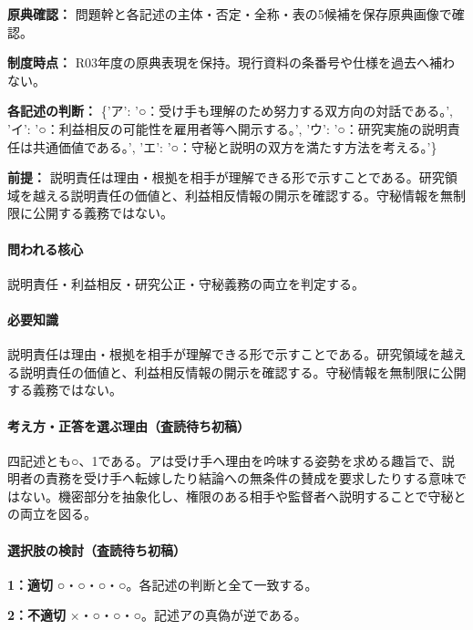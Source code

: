 \noindent\textbf{原典確認：} 問題幹と各記述の主体・否定・全称・表の5候補を保存原典画像で確認。\par

\noindent\textbf{制度時点：} R03年度の原典表現を保持。現行資料の条番号や仕様を過去へ補わない。\par

\noindent\textbf{各記述の判断：} \{'ア': '○：受け手も理解のため努力する双方向の対話である。', 'イ': '○：利益相反の可能性を雇用者等へ開示する。', 'ウ': '○：研究実施の説明責任は共通価値である。', 'エ': '○：守秘と説明の双方を満たす方法を考える。'\}\par

\noindent\textbf{前提：} 説明責任は理由・根拠を相手が理解できる形で示すことである。研究領域を越える説明責任の価値と、利益相反情報の開示を確認する。守秘情報を無制限に公開する義務ではない。\par

\paragraph{問われる核心} 説明責任・利益相反・研究公正・守秘義務の両立を判定する。

\paragraph{必要知識} 説明責任は理由・根拠を相手が理解できる形で示すことである。研究領域を越える説明責任の価値と、利益相反情報の開示を確認する。守秘情報を無制限に公開する義務ではない。

\paragraph{考え方・正答を選ぶ理由（査読待ち初稿）} 四記述とも○、1である。アは受け手へ理由を吟味する姿勢を求める趣旨で、説明者の責務を受け手へ転嫁したり結論への無条件の賛成を要求したりする意味ではない。機密部分を抽象化し、権限のある相手や監督者へ説明することで守秘との両立を図る。

\paragraph{選択肢の検討（査読待ち初稿）}\mbox{}\par

\noindent\textbf{1：適切} ○・○・○・○。各記述の判断と全て一致する。\par

\noindent\textbf{2：不適切} ×・○・○・○。記述アの真偽が逆である。\par

